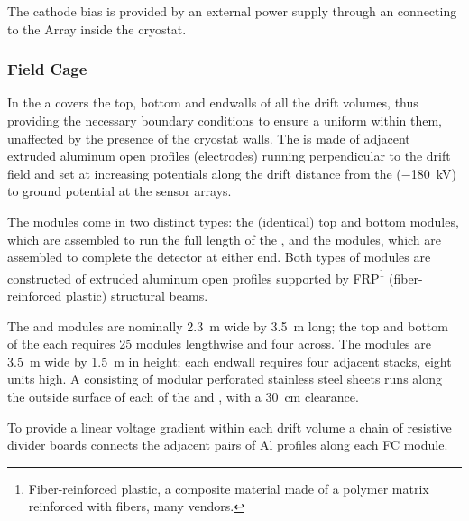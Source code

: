 The cathode bias is provided by an external  power supply through an  \fdth connecting to the  Array %
inside the cryostat. 
 
\subsubsection{Field Cage}
\label{sec:fdsp-hv-des-fc}

In the  a  covers the top, bottom and endwalls of all the drift volumes, thus providing the necessary
boundary conditions to ensure a uniform \efield within them, unaffected by the presence of the cryostat walls. %
The  is made of adjacent extruded aluminum open profiles (electrodes) running perpendicular to the drift field and set at increasing potentials along the \spmaxdrift drift distance from the   (\SI{-180}{kV}) to ground potential at the  sensor arrays. %

The  modules come in two distinct types: the (identical) top and bottom modules, which are assembled to run the full length of the , and the  modules, 
which are assembled to complete the detector at either end. Both types of modules are constructed of extruded aluminum open profiles  supported by FRP\footnote{Fiber-reinforced plastic, a composite material made of a polymer matrix reinforced with fibers, many vendors.} (fiber-reinforced plastic) structural beams.  

The  and  modules are nominally  \SI{2.3}{\meter} wide by \SI{3.5}{\meter} long; the top and bottom of the  each requires 25 modules lengthwise and four across.  The  modules are \SI{3.5}{\meter} wide by \SI{1.5}{\meter} in height; each endwall requires four adjacent stacks, eight units high. A  consisting of modular %
perforated stainless steel sheets %
runs along the outside surface of each of the %
 and , with a \SI{30}{\centi\meter} clearance. 

To provide a linear voltage gradient within each drift volume %
a chain of resistive divider boards connects the adjacent pairs of Al profiles along each FC module. 

